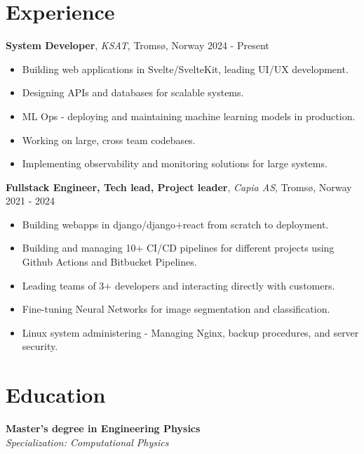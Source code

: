 \documentclass[11pt, a4paper]{article}
\begin{document}
\section*{Experience}
\textbf{System Developer}, \textit{KSAT}, Tromsø, Norway \hfill 2024 - Present
\begin{itemize}[noitemsep]
    \item Building web applications in Svelte/SvelteKit, leading UI/UX development.
    \item Designing APIs and databases for scalable systems.
    \item ML Ops - deploying and maintaining machine learning models in production.
    \item Working on large, cross team codebases.
    \item Implementing observability and monitoring solutions for large systems.
\end{itemize}
\textbf{Fullstack Engineer, Tech lead, Project leader}, \textit{Capia AS}, Tromsø, Norway \hfill 2021 - 2024
\begin{itemize}[noitemsep]
    \item Building webapps in django/django$+$react from scratch to deployment.
    \item Building and managing 10$+$ CI/CD pipelines for different projects using Github Actions and Bitbucket Pipelines.
    \item Leading teams of 3$+$ developers and interacting directly with customers.
    \item Fine-tuning Neural Networks for image segmentation and classification.
    \item Linux system administering - Managing Nginx, backup procedures, and server security.
\end{itemize}

\section*{Education}
\textbf{Master's degree in Engineering Physics}\\
\textit{Specialization: Computational Physics}
\end{document}
